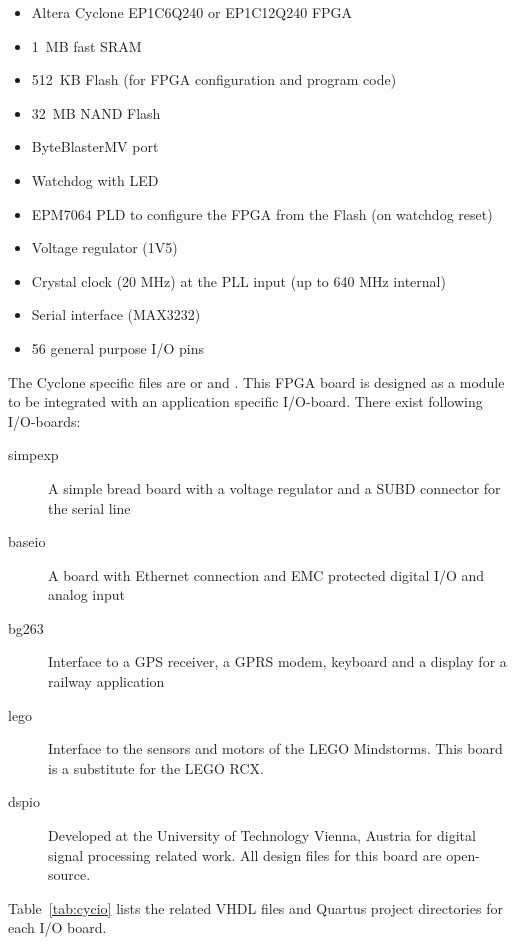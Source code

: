 \begin{itemize}
    \item Altera Cyclone EP1C6Q240 or EP1C12Q240 FPGA
    \item 1~MB fast SRAM
    \item 512~KB Flash (for FPGA configuration and program code)
    \item 32~MB NAND Flash
    \item ByteBlasterMV port
    \item Watchdog with LED
    \item EPM7064 PLD to configure the FPGA from the Flash (on watchdog reset)
    \item Voltage regulator (1V5)
    \item Crystal clock (20 MHz) at the PLL input (up to 640 MHz internal)
    \item Serial interface (MAX3232)
    \item 56 general purpose I/O pins
\end{itemize}

The Cyclone specific files are  or 
and . This FPGA board is designed as a module to be
integrated with an application specific I/O-board. There exist
following I/O-boards:
%
\begin{description}
    \item[simpexp] A simple bread board with a voltage regulator and
    a SUBD connector for the serial line
    \item[baseio] A board with Ethernet connection and EMC
        protected digital I/O and analog input
    \item[bg263] Interface to a GPS receiver, a GPRS modem, keyboard
    and a display for a railway application
    \item[lego] Interface to the sensors and motors of the LEGO
    Mindstorms. This board is a substitute for the LEGO RCX.
    \item[dspio] Developed at the University of Technology Vienna, Austria for
    digital signal processing related work. All design files for this
    board are open-source.
\end{description}
%
Table~\ref{tab:cycio} lists the related VHDL files and Quartus
project directories for each I/O board.

